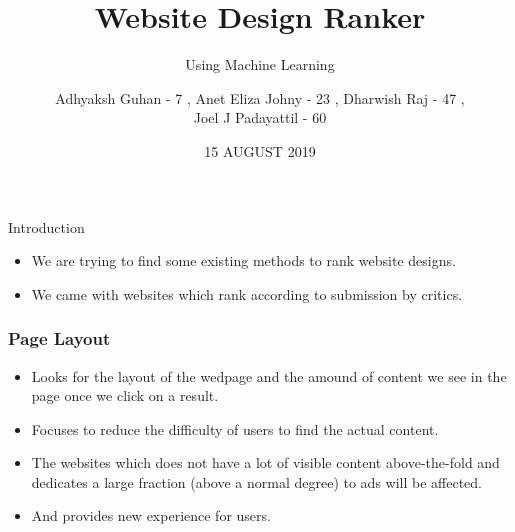 \documentclass[11pt]{beamer}
\begin{document}
	\title{\textbf{Website Design Ranker}}
	\subtitle{Using Machine Learning}
	\date{15 AUGUST 2019}
	\author{{\scriptsize Adhyaksh Guhan - 7 , Anet Eliza Johny - 23 , Dharwish Raj - 47 , \\ Joel J Padayattil - 60}}
	\begin{frame}[plain]
		\maketitle
	\end{frame}
	\begin{frame}{Introduction}
		\begin{itemize}
			\item We are trying to find some existing methods to rank website designs.
			
			\item We came with websites which rank according to submission by critics.
			
		\end{itemize}
	\end{frame}
\begin{frame}
\frametitle{\textbf{Page Layout}}
\begin{itemize}
	\item Looks for the layout of the wedpage and the amound of content we see in the page once we click on a result.
	
	\item Focuses to reduce the difficulty of users to find the actual content.
	
	\item  The websites which does not have a lot of visible content above-the-fold and dedicates a large fraction (above a normal degree) to ads will be affected.
	
	\item And provides new experience for users.
\end{itemize}

\end{frame}
\end{document}
